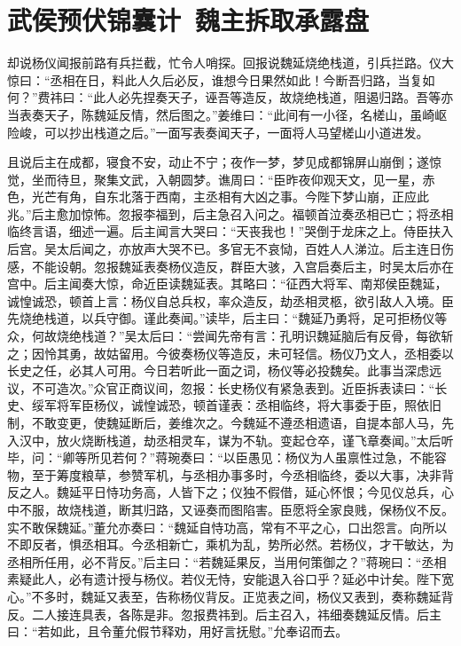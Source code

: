 \chapter{武侯预伏锦囊计~魏主拆取承露盘}

却说杨仪闻报前路有兵拦截，忙令人哨探。回报说魏延烧绝栈道，引兵拦路。仪大惊曰：“丞相在日，料此人久后必反，谁想今日果然如此！今断吾归路，当复如何？”费祎曰：“此人必先捏奏天子，诬吾等造反，故烧绝栈道，阻遏归路。吾等亦当表奏天子，陈魏延反情，然后图之。”姜维曰：“此间有一小径，名槎山，虽崎岖险峻，可以抄出栈道之后。”一面写表奏闻天子，一面将人马望槎山小道进发。

且说后主在成都，寝食不安，动止不宁；夜作一梦，梦见成都锦屏山崩倒；遂惊觉，坐而待旦，聚集文武，入朝圆梦。谯周曰：“臣昨夜仰观天文，见一星，赤色，光芒有角，自东北落于西南，主丞相有大凶之事。今陛下梦山崩，正应此兆。”后主愈加惊怖。忽报李福到，后主急召入问之。福顿首泣奏丞相已亡；将丞相临终言语，细述一遍。后主闻言大哭曰：“天丧我也！”哭倒于龙床之上。侍臣扶入后宫。吴太后闻之，亦放声大哭不已。多官无不哀恸，百姓人人涕泣。后主连日伤感，不能设朝。忽报魏延表奏杨仪造反，群臣大骇，入宫启奏后主，时吴太后亦在宫中。后主闻奏大惊，命近臣读魏延表。其略曰：“征西大将军、南郑侯臣魏延，诚惶诚恐，顿首上言：杨仪自总兵权，率众造反，劫丞相灵柩，欲引敌人入境。臣先烧绝栈道，以兵守御。谨此奏闻。”读毕，后主曰：“魏延乃勇将，足可拒杨仪等众，何故烧绝栈道？”吴太后曰：“尝闻先帝有言：孔明识魏延脑后有反骨，每欲斩之；因怜其勇，故姑留用。今彼奏杨仪等造反，未可轻信。杨仪乃文人，丞相委以长史之任，必其人可用。今日若听此一面之词，杨仪等必投魏矣。此事当深虑远议，不可造次。”众官正商议间，忽报：长史杨仪有紧急表到。近臣拆表读曰：“长史、绥军将军臣杨仪，诚惶诚恐，顿首谨表：丞相临终，将大事委于臣，照依旧制，不敢变更，使魏延断后，姜维次之。今魏延不遵丞相遗语，自提本部人马，先入汉中，放火烧断栈道，劫丞相灵车，谋为不轨。变起仓卒，谨飞章奏闻。”太后听毕，问：“卿等所见若何？”蒋琬奏曰：“以臣愚见：杨仪为人虽禀性过急，不能容物，至于筹度粮草，参赞军机，与丞相办事多时，今丞相临终，委以大事，决非背反之人。魏延平日恃功务高，人皆下之；仪独不假借，延心怀恨；今见仪总兵，心中不服，故烧栈道，断其归路，又诬奏而图陷害。臣愿将全家良贱，保杨仪不反。实不敢保魏延。”董允亦奏曰：“魏延自恃功高，常有不平之心，口出怨言。向所以不即反者，惧丞相耳。今丞相新亡，乘机为乱，势所必然。若杨仪，才干敏达，为丞相所任用，必不背反。”后主曰：“若魏延果反，当用何策御之？”蒋琬曰：“丞相素疑此人，必有遗计授与杨仪。若仪无恃，安能退入谷口乎？延必中计矣。陛下宽心。”不多时，魏延又表至，告称杨仪背反。正览表之间，杨仪又表到，奏称魏延背反。二人接连具表，各陈是非。忽报费祎到。后主召入，祎细奏魏延反情。后主曰：“若如此，且令董允假节释劝，用好言抚慰。”允奉诏而去。


